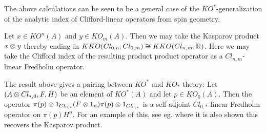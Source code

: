 The above calculations can be seen to be a general case of the $KO^{*}$-generalization of the analytic index of Clifford-linear operators from spin geometry. 
\begin{definition}
	Let $x\in KO^n(A)$ and $y\in KO_m(A)$. Then we may take the Kasparov product $x\otimes y$ thereby ending in $KKO(Cl_{0,n},Cl_{0,m})\cong KKO(Cl_{n,m},\mathbb{R})$. Here we may take the Clifford index of the resulting product product operator as a $Cl_{n,m}$-linear Fredholm operator.
\end{definition}
\begin{remark}
	The result above gives a pairing between $KO^*$ and $KO_*$-theory: Let $(A\otimes Cl_{*,0},F,H)$ be an element of $KO^*(A)$ and let $p\in KO_0(A)$. Then the operator $\pi(p)\otimes 1_{Cl_{0,*}}(F\otimes 1_n)\pi(p)\otimes 1_{Cl_{0,*}}$ is a self-adjoint $Cl_{0,*}$-linear Fredholm operator on $\pi(p) H^n$.
	For an example of this, see eg. \cite{bourne} where it is also shown this recovers the Kasparov product. 
\end{remark}